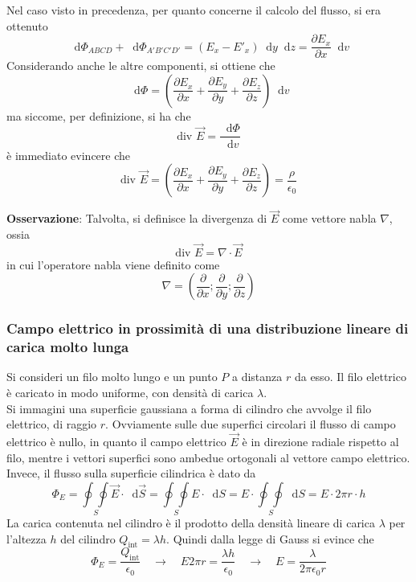 \documentclass[a4paper]{extarticle}
\newcommand\dif{\mathop{}\!\mathrm{d}}
\begin{document}
\vspace{1em}
\noindent
Nel caso visto in precedenza, per quanto concerne il calcolo del flusso, si era ottenuto
\[\dif \Phi_{ABCD} + \dif \Phi_{A'B'C'D'} = \left(E_x-E'_x\right) \dif y \dif z = \frac{\partial E_x}{\partial x} \dif v\]
Considerando anche le altre componenti, si ottiene che
\[\dif \Phi = \left(\frac{\partial E_x}{\partial x} + \frac{\partial E_y}{\partial y} + \frac{\partial E_z}{\partial z}\right) \dif v\]
ma siccome, per definizione, si ha che
\[\text{div } \vec E = \frac{\dif \Phi}{\dif v}\]
è immediato evincere che
\[\text{div } \vec E = \left(\frac{\partial E_x}{\partial x} + \frac{\partial E_y}{\partial y} + \frac{\partial E_z}{\partial z}\right) = \frac{\rho}{\epsilon_0}\]

\vspace{1em}
\noindent
\textbf{Osservazione}: Talvolta, si definisce la divergenza di $\vec E$ come vettore nabla $\nabla$, ossia
\[\text{div } \vec E = \nabla \cdot \vec E\]
in cui l'operatore nabla viene definito come
\[\nabla = \left(\frac{\partial}{\partial x}; \frac{\partial}{\partial y};\frac{\partial}{\partial z}\right)\]

\newpage
\noindent
\subsubsection{Campo elettrico in prossimità di una distribuzione lineare di carica molto lunga}
Si consideri un filo molto lungo e un punto $P$ a distanza $r$ da esso. Il filo elettrico è caricato in modo uniforme, con densità di carica $\lambda$.\\
Si immagini una superficie gaussiana a forma di cilindro che avvolge il filo elettrico, di raggio $r$. Ovviamente sulle due superfici circolari il flusso di campo elettrico è nullo, in quanto il campo elettrico $\vec E$ è in direzione radiale rispetto al filo, mentre i vettori superfici sono ambedue ortogonali al vettore campo elettrico.\\
Invece, il flusso sulla superficie cilindrica è dato da
\[\Phi_E = \underset{S}{\oint \oint} \vec E \cdot \dif \vec S = \underset{S}{\oint \oint} E \cdot \dif S = E \cdot \underset{S}{\oint \oint}  \dif S = E \cdot 2\pi r \cdot h\]
La carica contenuta nel cilindro è il prodotto della densità lineare di carica $\lambda$ per l'altezza $h$ del cilindro $Q_\text{int} = \lambda h$. Quindi dalla legge di Gauss si evince che
\[\Phi_E = \frac{Q_\text{int}}{\epsilon_0} \hspace{1em} \rightarrow \hspace{1em} E 2 \pi r = \frac{\lambda h}{\epsilon_0} \hspace{1em} \rightarrow \hspace{1em} E = \frac{\lambda}{2 \pi \epsilon_0 r}\]
\end{document}

